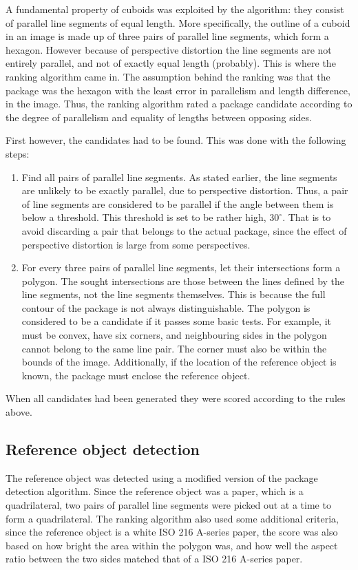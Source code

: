 A fundamental property of cuboids was exploited by the algorithm: they consist of parallel line segments of equal length. 
More specifically, the outline of a cuboid in an image is made up of three pairs of parallel line segments, which form a hexagon. 
However because of perspective distortion the line segments are not entirely parallel, and not of exactly equal length (probably).
This is where the ranking algorithm came in.
The assumption behind the ranking was that the package was the hexagon with the least error in parallelism and length difference, in the image.
Thus, the ranking algorithm rated a package candidate according to the degree of parallelism and equality of lengths between opposing sides.

First however, the candidates had to be found.
This was done with the following steps:
\begin{enumerate}
	\item Find all pairs of parallel line segments. 
		As stated earlier, the line segments are unlikely to be exactly parallel, due to perspective distortion.
		Thus, a pair of line segments are considered to be parallel if the angle between them is below a threshold.
		This threshold is set to be rather high, $30^\circ$. 
		That is to avoid discarding a pair that belongs to the actual package, since the effect of perspective distortion is large from some perspectives. %
	\item For every three pairs of parallel line segments, let their intersections form a polygon.
		The sought intersections are those between the lines defined by the line segments, not the line segments themselves.
		This is because the full contour of the package is not always distinguishable.
		The polygon is considered to be a candidate if it passes some basic tests.
		For example, it must be convex, have six corners, and neighbouring sides in the polygon cannot belong to the same line pair. 
		The corner must also be within the bounds of the image.
		Additionally, if the location of the reference object is known, the package must enclose the reference object.
\end{enumerate}

When all candidates had been generated they were scored according to the rules above.

\subsection{Reference object detection}
The reference object was detected using a modified version of the package detection algorithm.
Since the reference object was a paper, which is a quadrilateral, two pairs of parallel line segments were picked out at a time to form a quadrilateral.
The ranking algorithm also used some additional criteria, since the reference object is a white ISO 216 A-series  paper, the score was also based on how bright the area within the polygon was, and how well the aspect ratio between the two sides matched that of a ISO 216 A-series paper.

